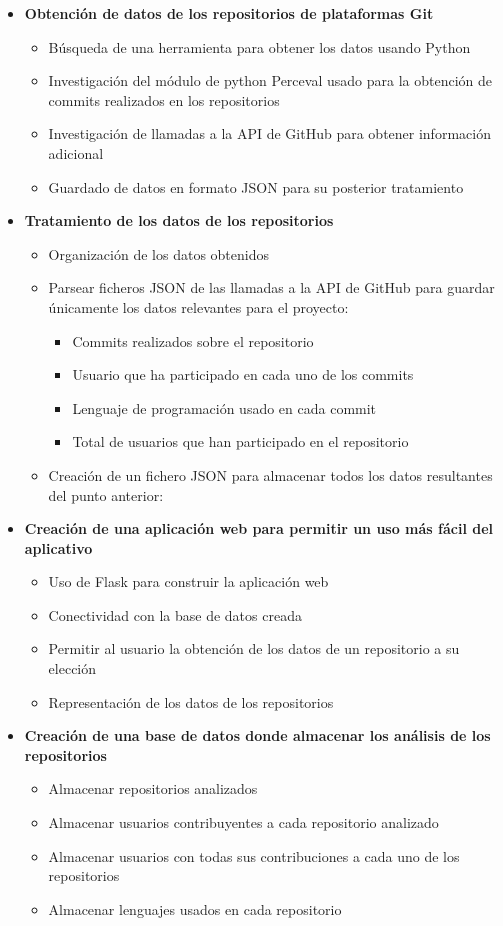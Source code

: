 \documentclass[a4paper, 12pt]{book}
\begin{document}
\begin{itemize}
  \item \textbf{Obtención de datos de los repositorios de plataformas Git}
        \begin{itemize}
  \item Búsqueda de una herramienta para obtener los datos usando Python
  \item Investigación del módulo de python Perceval usado para la obtención de commits realizados en los repositorios
  \item Investigación de llamadas a la API de GitHub para obtener información adicional
  \item Guardado de datos en formato JSON para su posterior tratamiento
\end{itemize}
\item \textbf{Tratamiento de los datos de los repositorios}
\begin{itemize}
\item Organización de los datos obtenidos
\item Parsear ficheros JSON de las llamadas a la API de GitHub para guardar únicamente los datos relevantes para el proyecto:
\begin{itemize}
  \item Commits realizados sobre el repositorio
  \item Usuario que ha participado en cada uno de los commits
  \item Lenguaje de programación usado en cada commit
  \item Total de usuarios que han participado en el repositorio
\end{itemize}
\item Creación de un fichero JSON para almacenar todos los datos resultantes del punto anterior:
\end{itemize}
\item \textbf{Creación de una aplicación web para permitir un uso más fácil del aplicativo}
\begin{itemize}
  \item Uso de Flask para construir la aplicación web
  \item Conectividad con la base de datos creada
  \item Permitir al usuario la obtención de los datos de un repositorio a su elección
  \item Representación de los datos de los repositorios
\end{itemize}
\item \textbf{Creación de una base de datos donde almacenar los análisis de los repositorios}
\begin{itemize}
  \item Almacenar repositorios analizados
  \item Almacenar usuarios contribuyentes a cada repositorio analizado
  \item Almacenar usuarios con todas sus contribuciones a cada uno de los repositorios
  \item Almacenar lenguajes usados en cada repositorio
\end{itemize}
\end{itemize}
\end{document}
